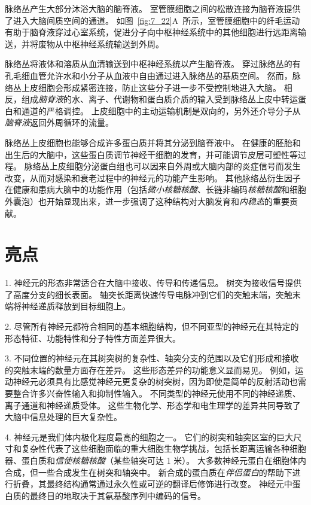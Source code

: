 脉络丛产生大部分沐浴大脑的脑脊液。
室管膜细胞之间的松散连接为脑脊液提供了进入大脑间质空间的通道。
如图~\ref{fig:7_22}A~所示，室管膜细胞中的纤毛运动有助于脑脊液穿过心室系统，促进分子向中枢神经系统中的其他细胞进行远距离输送，并将废物从中枢神经系统输送到外周。


脉络丛将液体和溶质从血清输送到中枢神经系统以产生脑脊液。
穿过脉络丛的有孔毛细血管允许水和小分子从血液中自由通过进入脉络丛的基质空间。
然而，脉络丛上皮细胞会形成紧密连接，防止这些分子进一步不受控制地进入大脑。
相反，组成\textit{脑脊液}的水、离子、代谢物和蛋白质介质的输入受到脉络丛上皮中转运蛋白和通道的严格调控。
上皮细胞中的主动运输机制是双向的，另外还介导分子从\textit{脑脊液}返回外周循环的流量。


脉络丛上皮细胞也能够合成许多蛋白质并将其分泌到脑脊液中。
在健康的胚胎和出生后的大脑中，这些蛋白质调节神经干细胞的发育，并可能调节皮层可塑性等过程。
脉络丛上皮细胞分泌蛋白组也可以因来自外周或大脑内部的炎症信号而发生改变，从而对感染和衰老过程中的神经元的功能产生影响。
其他脉络丛衍生因子在健康和患病大脑中的功能作用（包括\textit{微小核糖核酸}、长链非编码\textit{核糖核酸}和细胞外囊泡）也开始显现出来，进一步强调了这种结构对大脑发育和\textit{内稳态}的重要贡献。



\section{亮点}

1. 神经元的形态非常适合在大脑中接收、传导和传递信息。
树突为接收信号提供了高度分支的细长表面。
轴突长距离快速传导电脉冲到它们的突触末端，突触末端将神经递质释放到目标细胞上。


2. 尽管所有神经元都符合相同的基本细胞结构，但不同亚型的神经元在其特定的形态特征、功能特性和分子特性方面差异很大。


3. 不同位置的神经元在其树突树的复杂性、轴突分支的范围以及它们形成和接收的突触末端的数量方面存在差异。
这些形态差异的功能意义显而易见。
例如，运动神经元必须具有比感觉神经元更复杂的树突树，因为即使是简单的反射活动也需要整合许多兴奋性输入和抑制性输入。
不同类型的神经元使用不同的神经递质、离子通道和神经递质受体。
这些生物化学、形态学和电生理学的差异共同导致了大脑中信息处理的巨大复杂性。


4. 神经元是我们体内极化程度最高的细胞之一。
它们的树突和轴突区室的巨大尺寸和复杂性代表了这些细胞面临的重大细胞生物学挑战，包括长距离运输各种细胞器、蛋白质和\textit{信使核糖核酸}（某些轴突可达 1 米）。
大多数神经元蛋白在细胞体内合成，但一些合成发生在树突和轴突中。
新合成的蛋白质在\textit{伴侣蛋白}的帮助下进行折叠，其最终结构通常通过永久性或可逆的翻译后修饰进行改变。
神经元中蛋白质的最终目的地取决于其氨基酸序列中编码的信号。


